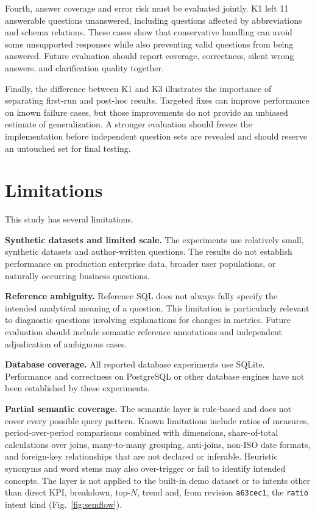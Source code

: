 \documentclass[conference]{IEEEtran}
\begin{document}
Fourth, answer coverage and error risk must be evaluated jointly. K1 left 11 answerable questions unanswered, including questions affected by abbreviations and schema relations. These cases show that conservative handling can avoid some unsupported responses while also preventing valid questions from being answered. Future evaluation should report coverage, correctness, silent wrong answers, and clarification quality together.

Finally, the difference between K1 and K3 illustrates the importance of separating first-run and post-hoc results. Targeted fixes can improve performance on known failure cases, but those improvements do not provide an unbiased estimate of generalization. A stronger evaluation should freeze the implementation before independent question sets are revealed and should reserve an untouched set for final testing.

\section{Limitations}

This study has several limitations.

\textbf{Synthetic datasets and limited scale.} The experiments use relatively small, synthetic datasets and author-written questions. The results do not establish performance on production enterprise data, broader user populations, or naturally occurring business questions.

\textbf{Reference ambiguity.} Reference SQL does not always fully specify the intended analytical meaning of a question. This limitation is particularly relevant to diagnostic questions involving explanations for changes in metrics. Future evaluation should include semantic reference annotations and independent adjudication of ambiguous cases.

\textbf{Database coverage.} All reported database experiments use SQLite. Performance and correctness on PostgreSQL or other database engines have not been established by these experiments.

\textbf{Partial semantic coverage.} The semantic layer is rule-based and does not cover every possible query pattern. Known limitations include ratios of measures, period-over-period comparisons combined with dimensions, share-of-total calculations over joins, many-to-many grouping, anti-joins, non-ISO date formats, and foreign-key relationships that are not declared or inferable. Heuristic synonyms and word stems may also over-trigger or fail to identify intended concepts. The layer is not applied to the built-in demo dataset or to intents other than direct KPI, breakdown, top-$N$, trend and, from revision \texttt{a63cec1}, the \texttt{ratio} intent kind (Fig.~\ref{fig:semflow}).
\end{document}
